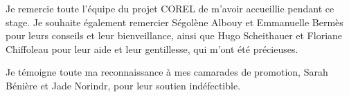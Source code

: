 Je remercie toute l'équipe du projet COREL de m'avoir accueillie pendant ce stage. Je souhaite également remercier Ségolène Albouy et Emmanuelle Bermès pour leurs conseils et leur bienveillance, ainsi que Hugo Scheithauer et Floriane Chiffoleau pour leur aide et leur gentillesse, qui m'ont été précieuses. 

Je témoigne toute ma reconnaissance à mes camarades de promotion, Sarah Bénière et Jade Norindr, pour leur soutien indéfectible. 